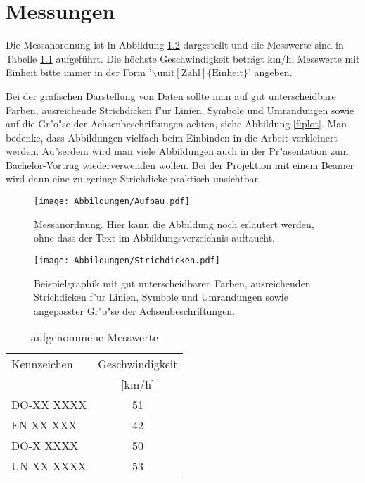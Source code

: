 \chapter{Messungen}
\label{c:Messungen}

Die Messanordnung ist in Abbildung \ref{f:Aufbau} dargestellt und die Messwerte sind in Tabelle \ref{t:Messwerte} aufgef\"uhrt. Die h\"ochste Geschwindigkeit betr\"agt \unit[53]{km/h}. Messwerte mit Einheit bitte immer in der
Form '$\mathrm{\backslash unit[Zahl]\{Einheit\}}$' angeben.

Bei der grafischen Darstellung von Daten
     sollte man auf gut unterscheidbare Farben, ausreichende
     Strichdicken f"ur Linien, Symbole und Umrandungen sowie auf die
     Gr"o"se der Achsenbeschriftungen achten, siehe Abbildung \ref{f:plot}. Man bedenke, dass
     Abbildungen vielfach beim Einbinden in die Arbeit  verkleinert
     werden. Au"serdem wird man viele Abbildungen auch in der
     Pr"asentation zum Bachelor-Vortrag wiederverwenden wollen. Bei der
   Projektion mit einem Beamer wird dann eine zu geringe Strichdicke
   praktisch unsichtbar


\begin{figure}[!h]
 \begin{center}
   \texttt{[image: Abbildungen/Aufbau.pdf]}
   \caption[Messanordnung]{Messanordnung. Hier kann die Abbildung noch erl\"autert werden, ohne dass der Text im Abbildungsverzeichnis auftaucht.}
   \label{f:Aufbau}
 \end{center}
\end{figure}

\begin{figure}[!h]
 \begin{center}
   \texttt{[image: Abbildungen/Strichdicken.pdf]}
   \caption[Graphik]{Beispielgraphik mit gut unterscheidbaren Farben, ausreichenden
     Strichdicken f"ur Linien, Symbole und Umrandungen sowie angepasster
     Gr"o"se der Achsenbeschriftungen. }\label{f:plot}
   \label{f:Aufbau}
 \end{center}
\end{figure}


\begin{table}[!h]
\caption{aufgenommene Messwerte}
\label{t:Messwerte}
\vspace{2pt}
\begin{center}
\begin{tabular}{|l c|}
\hline
Kennzeichen & Geschwindigkeit\\
& [km/h] \\
\hline
\hline
DO-XX XXXX & 51\\
EN-XX  XXX & 42\\
DO-X  XXXX & 50\\
UN-XX XXXX & 53\\
\hline
\end{tabular}
\end{center}
\end{table} 